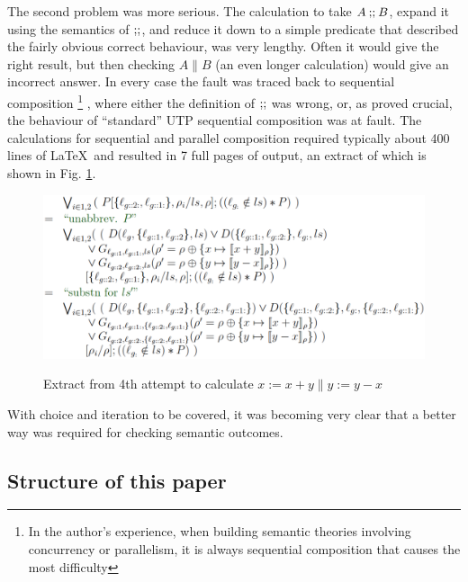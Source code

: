 The second problem was more serious.
The calculation to take $A \mathbin{\mathbf{;\!;}} B$,
expand it using the semantics of $\mathbin{\mathbf{;\!;}}$,
and reduce it down to a simple predicate that described the fairly obvious
correct behaviour,
was very lengthy.
Often it would give the right result,
but then checking $A \parallel B$ (an even longer calculation)
would give an incorrect answer.
In every case the fault was traced back to sequential composition%
\footnote{
In the author's experience,
when building semantic theories involving concurrency or parallelism,
it is always sequential composition that causes the most difficulty
}
,
where either the definition of $\mathbin{\mathbf{;\!;}}$ was wrong,
or, as proved crucial,
the behaviour of ``standard'' UTP sequential composition
was at fault.
The calculations for sequential and parallel composition
required typically about 400 lines of \LaTeX\ and resulted
in 7 full pages of output,
an extract of which is shown in Fig. \ref{fig:attempt4}.

\begin{figure}
  \centering
  \includegraphics[width=4.5in]{Attempt4.eps}\\
  \caption{Extract from 4th attempt to calculate $x:=x+y \parallel y:=y-x$}
  \label{fig:attempt4}
\end{figure}

With choice and iteration to be covered,
it was becoming very clear that a better way was required
for checking semantic outcomes.


\subsection{Structure of this paper}
